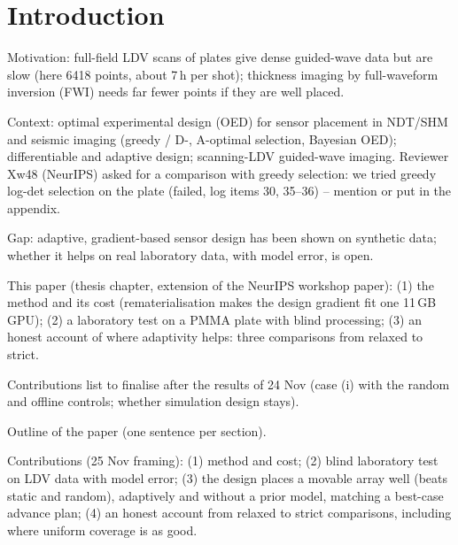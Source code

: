 \section{Introduction}\label{sec:intro}
\begin{notes}
\item Motivation: full-field LDV scans of plates give dense guided-wave data but are slow (here 6418 points, about 7\,h per shot); thickness imaging by full-waveform inversion (FWI) needs far fewer points if they are well placed.
\item Context: optimal experimental design (OED) for sensor placement in NDT/SHM and seismic imaging (greedy / D-, A-optimal selection, Bayesian OED); differentiable and adaptive design; scanning-LDV guided-wave imaging. Reviewer Xw48 (NeurIPS) asked for a comparison with greedy selection: we tried greedy log-det selection on the plate (failed, log items 30, 35--36) -- mention or put in the appendix.
\item Gap: adaptive, gradient-based sensor design has been shown on synthetic data; whether it helps on real laboratory data, with model error, is open.
\item This paper (thesis chapter, extension of the NeurIPS workshop paper): (1) the method and its cost (rematerialisation makes the design gradient fit one 11\,GB GPU); (2) a laboratory test on a PMMA plate with blind processing; (3) an honest account of where adaptivity helps: three comparisons from relaxed to strict.
\item Contributions list to finalise after the results of 24 Nov (case (i) with the random and offline controls; whether simulation design stays).
\item Outline of the paper (one sentence per section).
\item Contributions (25 Nov framing): (1) method and cost; (2) blind laboratory test on LDV data with model error; (3) the design places a movable array well (beats static and random), adaptively and without a prior model, matching a best-case advance plan; (4) an honest account from relaxed to strict comparisons, including where uniform coverage is as good.
\end{notes}
